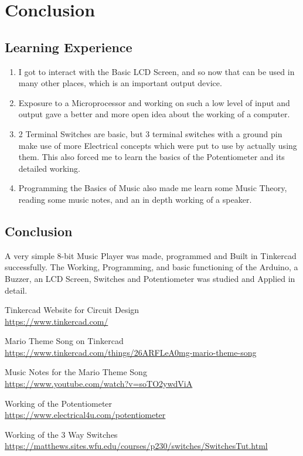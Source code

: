 \documentclass[11pt]{article}
\begin{document}
\section{Conclusion}
\subsection{Learning Experience}
\begin{enumerate}
	\item I got to interact with the Basic LCD Screen, and so now that can be used in many
	other places, which is an important output device.
	\item Exposure to a Microprocessor and working on such a low level of input and output
	gave a better and more open idea about the working of a computer.
	\item 2 Terminal Switches are basic, but 3 terminal switches with a ground pin make use of
	more Electrical concepts which were put to use by actually using them. This
	also forced me to learn the basics of the Potentiometer and its detailed working.
	\item Programming the Basics of Music also made me learn some Music Theory, reading
	some music notes, and an in depth working of a speaker.
\end{enumerate}

\subsection{Conclusion}
A very simple 8-bit Music Player was made, programmed and Built in
Tinkercad successfully. The Working, Programming, and basic functioning of the Arduino, a
Buzzer, an LCD Screen, Switches and Potentiometer was studied and
Applied in detail.
\pagebreak
\begin{thebibliography}{}
	
Tinkercad Website for Circuit Design\\
\url{https://www.tinkercad.com/}

Mario Theme Song on Tinkercad\\
\url{https://www.tinkercad.com/things/26ARFLeA0mg-mario-theme-song}

Music Notes for the Mario Theme Song\\
\url{https://www.youtube.com/watch?v=soTO2ywdViA}

Working of the Potentiometer\\
\url{https://www.electrical4u.com/potentiometer}

Working of the 3 Way Switches\\
\url{https://matthews.sites.wfu.edu/courses/p230/switches/SwitchesTut.html}

\end{thebibliography}
\end{document}
